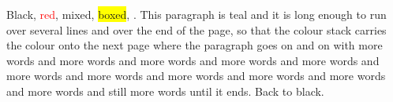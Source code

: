 \documentclass{article}
\begin{document}
Black, \textcolor{red}{red}, \textcolor{blue!50!green}{mixed},
\colorbox{yellow}{boxed}, .
{\color{teal} This paragraph is teal and it is long enough to run over
several lines and over the end of the page, so that the colour stack
carries the colour onto the next page where the paragraph goes on and
on with more words and more words and more words and more words and
more words and more words and more words and more words and more words
and more words and more words and still more words until it ends.}
Back to black.
\end{document}
